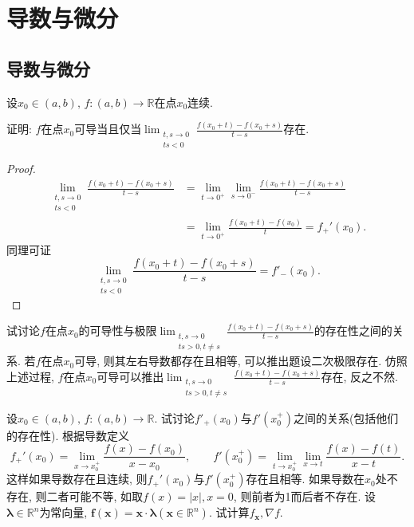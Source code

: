 \chapter{导数与微分}
\section{导数与微分}
\begin{quiza}
\woe 设\(x_0\in (a,b),\, f:(a,b)\rightarrow\mathbb{R}\)在点\(x_0\)连续.
\begin{quizs}
\item 证明: \(f\)在点\(x_0\)可导当且仅当\(\lim_{\substack{t,s\rightarrow 0\\ts<0}}\frac{f(x_0+t)-f(x_0+s)}{t-s}\)存在.
\begin{proof}
\[\begin{split}
\lim_{\substack{t,s\rightarrow 0\\ ts<0}}\frac{f(x_0+t)-f(x_0+s)}{t-s}&=\lim_{t\rightarrow 0^+}\lim_{s\rightarrow 0^-}\frac{f(x_0+t)-f(x_0+s)}{t-s}\\&=\lim_{t\rightarrow 0^+}\frac{f(x_0+t)-f(x_0)}{t}=f_+'(x_0).
\end{split}\]同理可证\[\lim_{\substack{t,s\rightarrow 0\\ ts<0}}\frac{f(x_0+t)-f(x_0+s)}{t-s}=f'_-(x_0).\]
\end{proof}
\item 试讨论\(f\)在点\(x_0\)的可导性与极限\(\lim_{\substack{t,s\rightarrow 0\\ ts>0,t\ne s}}\frac{f(x_0+t)-f(x_0+s)}{t-s}\)的存在性之间的关系.
\tcbline
若\(f\)在点\(x_0\)可导, 则其左右导数都存在且相等, 可以推出题设二次极限存在. 仿照上述过程, \(f\)在点\(x_0\)可导可以推出\(\lim_{\substack{t,s\rightarrow 0\\ ts>0,t\ne s}}\frac{f(x_0+t)-f(x_0+s)}{t-s}\)存在, 反之不然.
\end{quizs}
\woe 设\(x_0\in(a,b),\,f:(a,b)\rightarrow\mathbb{R}\). 试讨论\(f'_+(x_0)\)与\(f'(x_0^+)\)之间的关系(包括他们的存在性).
\tcbline
根据导数定义\[f_+'(x_0)=\lim_{x\rightarrow x_0^+}\frac{f(x)-f(x_0)}{x-x_0},\qquad f'(x_0^+)=\lim_{t\rightarrow x_0^+}\lim_{x\rightarrow t}\frac{f(x)-f(t)}{x-t}.\]这样如果导数存在且连续, 则\(f_+'(x_0)\)与\(f'(x_0^+)\)存在且相等. 如果导数在\(x_0\)处不存在, 则二者可能不等, 如取\(f(x)=|x|,x=0\), 则前者为1而后者不存在.
\woe 设\(\boldsymbol{\lambda}\in\mathbb{R}^n\)为常向量, \(\boldsymbol{f}(\boldsymbol{x})=\boldsymbol{x}\cdot\boldsymbol{\lambda}(\boldsymbol{x}\in\mathbb{R}^n)\). 试计算\(f_{\boldsymbol{x}},\nabla f\).

\end{quiza}
